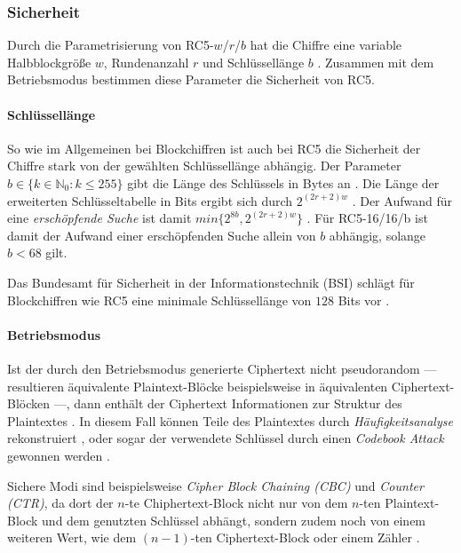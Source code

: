 \documentclass[course=erap]{aspdoc}
\begin{document}
\subsubsection{Sicherheit}
\label{sec:Sicherheit}

Durch die Parametrisierung von RC5-$w$/$r$/$b$ hat die Chiffre eine variable Halbblockgröße $w$, Rundenanzahl $r$ und Schlüssellänge $b$ \cite[p.2]{rc5rev}. Zusammen mit dem Betriebsmodus bestimmen diese Parameter die Sicherheit von RC5.

\paragraph{Schlüssellänge} So wie im Allgemeinen bei Blockchiffren ist auch bei RC5 die Sicherheit der Chiffre stark von der gewählten Schlüssellänge abhängig. Der Parameter $b \in \{k \in \mathbb{N}_0 \colon k \leq 255\}$ gibt die Länge des Schlüssels in Bytes an \cite[p.3]{rc5rev}. Die Länge der erweiterten Schlüsseltabelle in Bits ergibt sich durch $2^{(2r + 2)w}$ \cite[p.2]{rc5rev}. Der Aufwand für eine \textit{erschöpfende Suche} ist damit $min\{2^{8b}, 2^{(2r + 2)w}\}$ \cite[p.29]{kaliski+yin}. Für RC5-16/16/b ist damit der Aufwand einer erschöpfenden Suche allein von $b$ abhängig, solange $b < 68$ gilt.\bigbreak

Das Bundesamt für Sicherheit in der Informationstechnik (BSI) schlägt für Blockchiffren wie RC5 eine minimale Schlüssellänge von $128$ Bits vor \cite[p.21]{bsi}.

\paragraph{Betriebsmodus} Ist der durch den Betriebsmodus generierte Ciphertext nicht pseudorandom --- resultieren äquivalente Plaintext-Blöcke beispielsweise in äquivalenten Ciphertext-Blöcken ---, dann enthält der Ciphertext Informationen zur Struktur des Plaintextes \cite[p.22]{bsi}. In diesem Fall können Teile des Plaintextes durch \textit{Häufigkeitsanalyse} rekonstruiert \cite[p.22]{bsi}, oder sogar der verwendete Schlüssel durch einen \textit{Codebook Attack} gewonnen werden \cite[p.2]{elbaz}.\bigbreak

Sichere Modi sind beispielsweise \textit{Cipher Block Chaining (CBC)} und \textit{Counter (CTR)}, da dort der $n$-te Chiphertext-Block nicht nur von dem $n$-ten Plaintext-Block und dem genutzten Schlüssel abhängt, sondern zudem noch von einem weiteren Wert, wie dem $(n-1)$-ten Ciphertext-Block oder einem Zähler \cite[p.22]{bsi}.
\end{document}
